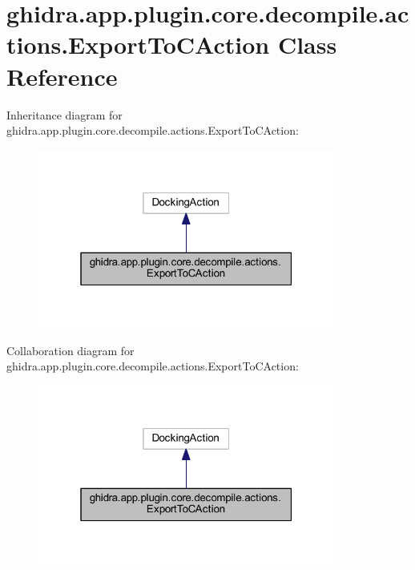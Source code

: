 \hypertarget{classghidra_1_1app_1_1plugin_1_1core_1_1decompile_1_1actions_1_1_export_to_c_action}{}\section{ghidra.\+app.\+plugin.\+core.\+decompile.\+actions.\+Export\+To\+C\+Action Class Reference}
\label{classghidra_1_1app_1_1plugin_1_1core_1_1decompile_1_1actions_1_1_export_to_c_action}


Inheritance diagram for ghidra.\+app.\+plugin.\+core.\+decompile.\+actions.\+Export\+To\+C\+Action\+:
\nopagebreak
\begin{figure}[H]
\begin{center}
\leavevmode
\includegraphics[width=277pt]{classghidra_1_1app_1_1plugin_1_1core_1_1decompile_1_1actions_1_1_export_to_c_action__inherit__graph}
\end{center}
\end{figure}


Collaboration diagram for ghidra.\+app.\+plugin.\+core.\+decompile.\+actions.\+Export\+To\+C\+Action\+:
\nopagebreak
\begin{figure}[H]
\begin{center}
\leavevmode
\includegraphics[width=277pt]{classghidra_1_1app_1_1plugin_1_1core_1_1decompile_1_1actions_1_1_export_to_c_action__coll__graph}
\end{center}
\end{figure}
